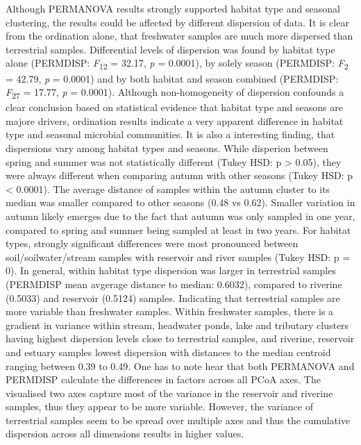 \documentclass[12pt,a4paper]{article} %
\begin{document}
Although PERMANOVA results strongly supported habitat type and seasonal clustering, the results could be affected by different dispersion of data. It is clear from the ordination alone, that freshwater samples are much more dispersed than terrestrial samples. Differential levels of dispersion was found by habitat type alone (PERMDISP: \textit{F}\textsubscript{12} = 32.17, \textit{p} = 0.0001), by solely season (PERMDISP: \textit{F}\textsubscript{2} = 42.79, \textit{p} = 0.0001) and by both habitat and season combined (PERMDISP: \textit{F}\textsubscript{27} = 17.77, \textit{p} = 0.0001). Although non-homogeneity of dispersion confounds a clear conclusion based on statistical evidence that habitat type and seasons are majore drivers, ordination results indicate a very apparent difference in habitat type and seasonal microbial communities. It is also a interesting finding, that dispersions vary among habitat types and seasons. While disperion between spring and summer was not statistically different (Tukey HSD: p > 0.05), they were always different when comparing autumn with other seasons (Tukey HSD: p < 0.0001). The average distance of samples within the autumn cluster to its median was smaller compared to other seasons (0.48 vs 0.62). Smaller variation in autumn likely emerges due to the fact that autumn was only sampled in one year, compared to spring and summer being sampled at least in two years. For habitat types, strongly significant differences were most pronounced between soil/soilwater/stream samples with reservoir and river samples (Tukey HSD: p = 0). In general, within habitat type dispersion was larger in terrestrial samples (PERMDISP mean avgerage distance to median: 0.6032), compared to riverine (0.5033) and reservoir (0.5124) samples. Indicating that terrestrial samples are more variable than freshwater samples. Within freshwater samples, there is a gradient in variance within stream, headwater ponds, lake and tributary clusters having highest dispersion levels close to terrestrial samples, and riverine, reservoir and estuary samples lowest dispersion with distances to the median centroid ranging between 0.39 to 0.49. One has to note hear that both PERMANOVA and PERMDISP calculate the differences in factors across all PCoA axes. The visualised two axes capture most of the variance in the reservoir and riverine samples, thus they appear to be more variable. However, the variance of terrestrial samples seem to be spread over multiple axes and thus the cumulative dispersion across all dimensions results in higher values.  
\end{document}
